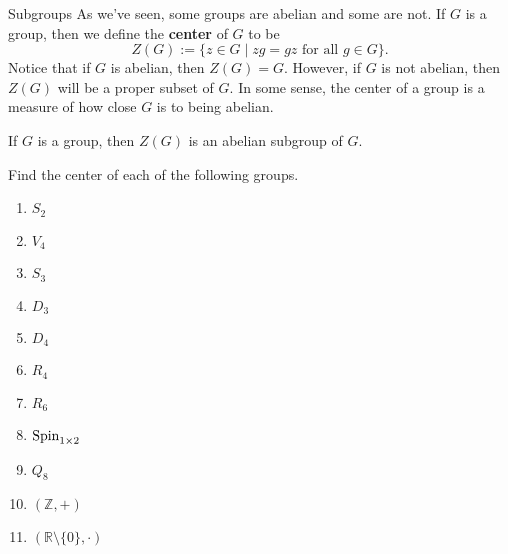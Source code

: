 \begin{section}{Subgroups}
As we've seen, some groups are abelian and some are not.  If $G$ is a group, then we define the \textbf{center} of $G$ to be
\[
Z(G):=\{z\in G\mid zg=gz\text{ for all } g\in G\}.
\]
Notice that if $G$ is abelian, then $Z(G)=G$.  However, if $G$ is not abelian, then $Z(G)$ will be a proper subset of $G$.  In some sense, the center of a group is a measure of how close $G$ is to being abelian.

\begin{theorem}
If $G$ is a group, then $Z(G)$ is an abelian subgroup of $G$.
\end{theorem}

\begin{problem}
Find the center of each of the following groups.
\begin{enumerate}[label=\rm{(\alph*)}]
\item $S_2$
\item $V_4$
\item $S_3$
\item $D_3$
\item $D_4$
\item $R_4$
\item $R_6$
\item $\operatorname{Spin}_{1\times 2}$
\item $Q_8$
\item $(\mathbb{Z},+)$
\item $(\mathbb{R}\setminus\{0\},\cdot)$
\end{enumerate}
\end{problem}

\end{section}


